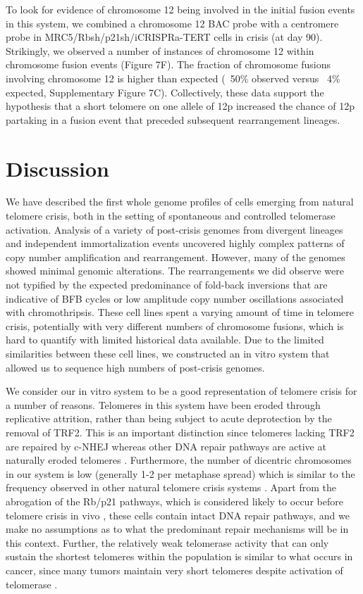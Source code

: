 \documentclass[phd,tocprelim]{cornell}
\begin{document}
To look for evidence of chromosome 12 being involved in the initial fusion events in this system, we combined a chromosome 12 BAC probe with a centromere probe in MRC5/Rbsh/p21sh/iCRISPRa-TERT cells in crisis (at day 90). Strikingly, we observed a number of instances of chromosome 12 within chromosome fusion events (Figure 7F). The fraction of chromosome fusions involving chromosome 12 is higher than expected (~50\% observed versus ~4\% expected, Supplementary Figure 7C). Collectively, these data support the hypothesis that a short telomere on one allele of 12p increased the chance of 12p partaking in a fusion event that preceded subsequent rearrangement lineages.


\section{Discussion}

We have described the first whole genome profiles of cells emerging from natural telomere crisis, both in the setting of spontaneous and controlled telomerase activation. Analysis of a variety of post-crisis genomes from divergent lineages and independent immortalization events uncovered highly complex patterns of copy number amplification and rearrangement. However, many of the genomes showed minimal genomic alterations. The rearrangements we did observe were not typified by the expected predominance of fold-back inversions that are indicative of BFB cycles or low amplitude copy number oscillations associated with chromothripsis. These cell lines spent a varying amount of time in telomere crisis, potentially with very different numbers of chromosome fusions, which is hard to quantify with limited historical data available. Due to the limited similarities between these cell lines, we constructed an in vitro system that allowed us to sequence high numbers of post-crisis genomes.

We consider our in vitro system to be a good representation of telomere crisis for a number of reasons. Telomeres in this system have been eroded through replicative attrition, rather than being subject to acute deprotection by the removal of TRF2. This is an important distinction since telomeres lacking TRF2 are repaired by c-NHEJ whereas other DNA repair pathways are active at naturally eroded telomeres \cite{Capper2007-oa,Smogorzewska2002-ki,Letsolo2010-bk}. Furthermore, the number of dicentric chromosomes in our system is low (generally 1-2 per metaphase spread) which is similar to the frequency observed in other natural telomere crisis systems \cite{Counter1992-yg}. Apart from the abrogation of the Rb/p21 pathways, which is considered likely to occur before telomere crisis in vivo \cite{Shay1991-rt,DAdda_di_Fagagna2003-oa,Brown1997-qr,Jacobs2004-zn}, these cells contain intact DNA repair pathways, and we make no assumptions as to what the predominant repair mechanisms will be in this context. Further, the relatively weak telomerase activity that can only sustain the shortest telomeres within the population is similar to what occurs in cancer, since many tumors maintain very short telomeres despite activation of telomerase \cite{Furugori2000-vn,De_Lange1990-mz,Mehle1994-jj,Barthel2017-va}.
\end{document}
